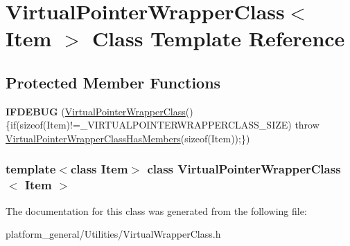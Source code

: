 \hypertarget{classVirtualPointerWrapperClass}{\section{\-Virtual\-Pointer\-Wrapper\-Class$<$ \-Item $>$ \-Class \-Template \-Reference}
\label{classVirtualPointerWrapperClass}
}
\subsection*{\-Protected \-Member \-Functions}
\begin{DoxyCompactItemize}
\item 
\hypertarget{classVirtualPointerWrapperClass_abffdd7cafb2dc7dd9662a03739014de5}{{\bfseries \-I\-F\-D\-E\-B\-U\-G} (\hyperlink{classVirtualPointerWrapperClass}{\-Virtual\-Pointer\-Wrapper\-Class}()\{if(sizeof(\-Item)!=\-\_\-\-V\-I\-R\-T\-U\-A\-L\-P\-O\-I\-N\-T\-E\-R\-W\-R\-A\-P\-P\-E\-R\-C\-L\-A\-S\-S\-\_\-\-S\-I\-Z\-E) throw \hyperlink{classVirtualPointerWrapperClassHasMembers}{\-Virtual\-Pointer\-Wrapper\-Class\-Has\-Members}(sizeof(\-Item));\})}\label{classVirtualPointerWrapperClass_abffdd7cafb2dc7dd9662a03739014de5}

\end{DoxyCompactItemize}
\subsubsection*{template$<$class Item$>$ class Virtual\-Pointer\-Wrapper\-Class$<$ Item $>$}



\-The documentation for this class was generated from the following file\-:\begin{DoxyCompactItemize}
\item 
platform\-\_\-general/\-Utilities/\-Virtual\-Wrapper\-Class.\-h\end{DoxyCompactItemize}
